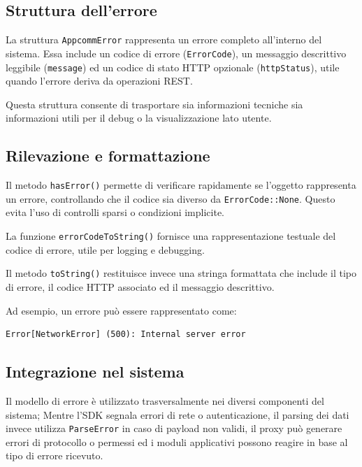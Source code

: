 \documentclass[a4paper, 11pt, twoside]{report}
\begin{document}
\subsection{Struttura dell'errore}

La struttura \texttt{AppcommError} rappresenta un errore completo all'interno del sistema. Essa include un codice di
errore (\texttt{ErrorCode}), un messaggio descrittivo leggibile (\texttt{message}) ed un codice di stato \gls{HTTP} opzionale
(\texttt{httpStatus}), utile quando l'errore deriva da operazioni \gls{REST}.

Questa struttura consente di trasportare sia informazioni tecniche sia informazioni utili per il debug o la 
visualizzazione lato utente.

\subsection{Rilevazione e formattazione}

Il metodo \texttt{hasError()} permette di verificare rapidamente se l'oggetto rappresenta un errore, controllando che
il codice sia diverso da \texttt{ErrorCode::None}. Questo evita l'uso di controlli sparsi o condizioni implicite.

La funzione \texttt{errorCodeToString()} fornisce una rappresentazione testuale del codice di errore, utile per logging
e debugging.

Il metodo \texttt{toString()} restituisce invece una stringa formattata che include il tipo di errore, il codice \gls{HTTP} 
associato ed il messaggio descrittivo.

Ad esempio, un errore può essere rappresentato come:

\begin{verbatim}
Error[NetworkError] (500): Internal server error
\end{verbatim}

\subsection{Integrazione nel sistema}

Il modello di errore è utilizzato trasversalmente nei diversi componenti del sistema;
Mentre l'\gls{SDK} segnala errori di rete o autenticazione, il parsing dei dati invece utilizza \texttt{ParseError} in caso
di payload non validi, il proxy può generare errori di protocollo o permessi ed i moduli applicativi possono reagire in
base al tipo di errore ricevuto.
\end{document}

